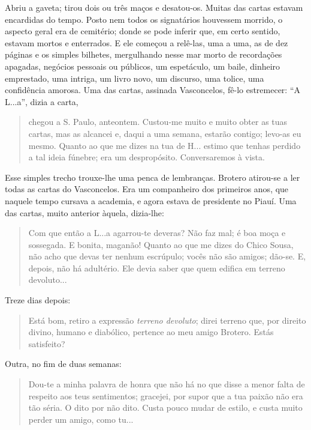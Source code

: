 Abriu a gaveta; tirou dois ou três maços e desatou-os. Muitas das cartas
estavam encardidas do tempo. Posto nem todos os signatários houvessem
morrido, o aspecto geral era de cemitério; donde se pode inferir que, em
certo sentido, estavam mortos e enterrados. E ele começou a relê-las,
uma a uma, as de dez páginas e os simples bilhetes, mergulhando nesse
mar morto de recordações apagadas, negócios pessoais ou públicos, um
espetáculo, um baile, dinheiro emprestado, uma intriga, um livro novo,
um discurso, uma tolice, uma confidência amorosa. Uma das cartas,
assinada Vasconcelos, fê-lo estremecer: ``A L...a'', dizia a carta,

\begin{quote}
chegou a S. Paulo, anteontem. Custou-me muito e muito obter as tuas
cartas, mas as alcancei e, daqui a uma semana, estarão contigo; levo-as
eu mesmo. Quanto ao que me dizes na tua de H... estimo que tenhas
perdido a tal ideia fúnebre; era um despropósito. Conversaremos à vista.
\end{quote}

Esse simples trecho trouxe-lhe uma penca de lembranças. Brotero
atirou-se a ler todas as cartas do Vasconcelos. Era um companheiro dos
primeiros anos, que naquele tempo cursava a academia, e agora estava de
presidente no Piauí. Uma das cartas, muito anterior àquela, dizia-lhe:

\begin{quote}
Com que então a L...a agarrou-te deveras? Não faz mal; é boa moça e
sossegada. E bonita, maganão! Quanto ao que me dizes do Chico Sousa, não
acho que devas ter nenhum escrúpulo; vocês não são amigos; dão-se. E,
depois, não há adultério. Ele devia saber que quem edifica em terreno
devoluto...
\end{quote}

Treze dias depois:

\begin{quote}
Está bom, retiro a expressão \emph{terreno devoluto}; direi terreno que,
por direito divino, humano e diabólico, pertence ao meu amigo Brotero.
Estás satisfeito?
\end{quote}

Outra, no fim de duas semanas:

\begin{quote}
Dou-te a minha palavra de honra que não há no que disse a menor falta de
respeito aos teus sentimentos; gracejei, por supor que a tua paixão não
era tão séria. O dito por não dito. Custa pouco mudar de estilo, e custa
muito perder um amigo, como tu...
\end{quote}


